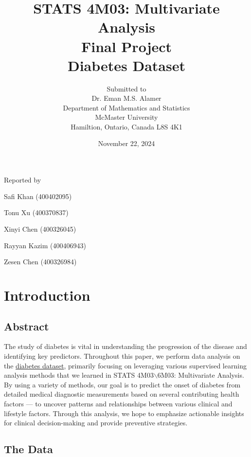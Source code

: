 \documentclass[12pt]{article}
\begin{document}
\title{STATS 4M03: Multivariate Analysis\\ Final Project \\ Diabetes Dataset }

\author{Submitted to\\ Dr. Eman M.S. Alamer 
\\Department of Mathematics and Statistics
\\McMaster University\\Hamiltion, Ontario, Canada L8S 4K1}
\date {November 22, 2024}


\maketitle

 \centerline{Reported by}
 \centerline{Safi Khan (400402095)}
 \centerline{Tonu Xu (400370837)}
 \centerline{Xinyi Chen (400326045)}
 \centerline{Rayyan Kazim (400406943)}
 \centerline{Zesen Chen (400326984)}


\newpage
\section{Introduction}
\subsection{Abstract}



\begin{indent} 
\onehalfspacing	
	
The study of diabetes is vital in understanding the progression of the disease and identifying key predictors. Throughout this paper, we perform data analysis on the \href{https://www.kaggle.com/datasets/hasibur013/diabetes-dataset}{diabetes dataset}, primarily focusing on leveraging various supervised learning analysis methods that we learned in STATS 4M03$\backslash$6M03: Multivariate Analysis. By using a variety of methods, our goal is to predict the onset of diabetes from detailed medical diagnostic measurements based on several contributing health factors --- to uncover patterns and relationships between various clinical and lifestyle factors. Through this analysis, we hope to emphasize actionable insights for clinical decision-making and provide preventive strategies. 
\end{indent}

\subsection{The Data}
\end{document}
